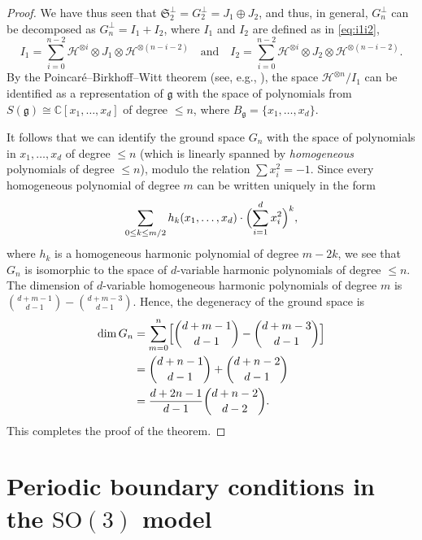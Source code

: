 \documentclass[a4paper]{article}
\newcommand{\SO}{\mathrm{SO}}
\theoremstyle{definition}
\begin{document}
\begin{proof}
We have thus seen that $\mathfrak{S}_2^\perp = G_2^\perp = J_1 \oplus J_2$, and thus, in general, $G_n^\perp$ can be decomposed as $ G_n^\perp = I_1 + I_2$, where $I_1$ and $I_2$ are defined as in \eqref{eq:i1i2},
\begin{equation*}
  I_1 = \sum_{i=0}^{n-2} \mathcal{H}^{\otimes i} \otimes J_1 \otimes \mathcal{H}^{\otimes (n-i-2)} \quad \text{and} \quad 
  I_2 = \sum_{i=0}^{n-2} \mathcal{H}^{\otimes i} \otimes J_2 \otimes \mathcal{H}^{\otimes (n-i-2)}.
\end{equation*}
By the Poincar\'e--Birkhoff--Witt theorem (see, e.g., \cite{dixmier1996enveloping}), the space $\mathcal{H}^{\otimes n}/I_1$ can be identified as a representation of $\mathfrak{g}$ with the space of polynomials from $S(\mathfrak{g}) \cong \mathbb{C}[x_1,\dots,x_d]$ of degree $\le n$, where $B_{\mathfrak{g}}=\{x_1,\dots,x_d\}$.

It follows that we can identify the ground space $G_n$ with the space of polynomials in $x_1,\dots,x_d$ of degree $\le n$ (which is linearly spanned by \emph{homogeneous} polynomials of degree $\le n$), modulo the relation $\sum x_i^2 = -1$. Since every homogeneous polynomial of degree $m$ can be written uniquely in the form
\[ \sum_{0\le k \le m/2} h_k(x_1,\dots,x_d) \cdot \Bigl(\sum_{i=1}^d x_i^2\Bigr)^k, \]
where $h_k$ is a homogeneous harmonic polynomial of degree $m-2k$,
we see that $G_n$ is isomorphic to the space of $d$-variable harmonic polynomials of degree $\le n$. The dimension of $d$-variable homogeneous harmonic polynomials of degree $m$ is $\binom{d + m -1}{d-1} - \binom{d+m -3}{d-1}$.
Hence, the degeneracy of the ground space is 
    \begin{align*}
        \dim G_n &= \sum_{m=0}^{n} \Bigl[\binom{d + m -1}{d-1} - \binom{d+m -3}{d-1} \Bigr]\\
        &= \binom{d + n -1}{d-1} + \binom{d+n -2}{d-1}  \\
        &= \frac{d+2n-1}{d-1} \binom{d+n-2}{d-2}.
    \end{align*}
This completes the proof of the theorem.
\end{proof}

\section{Periodic boundary conditions in the $\SO(3)$ model} \label{sec:pbc}
\end{document}
